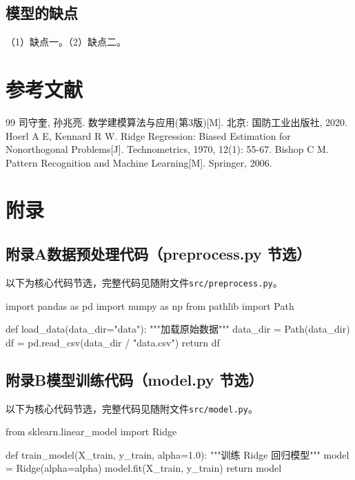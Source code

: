 \documentclass[12pt,a4paper]{article}
\renewcommand{\refname}{参考文献}
\begin{document}
\subsection{模型的缺点}

（1）缺点一。（2）缺点二。

\clearpage
\section{参考文献}

\renewcommand{\refname}{}

\begin{thebibliography}{99}
\setlength{\itemsep}{2pt}
\setlength{\topsep}{0pt}
\setlength{\labelsep}{0.5em}
 司守奎, 孙兆亮. 数学建模算法与应用(第3版)[M]. 北京: 国防工业出版社, 2020.
 Hoerl A E, Kennard R W. Ridge Regression: Biased Estimation for Nonorthogonal Problems[J]. Technometrics, 1970, 12(1): 55-67.
 Bishop C M. Pattern Recognition and Machine Learning[M]. Springer, 2006.
\end{thebibliography}

\clearpage
\section{附录}

\subsection*{附录A\quad 数据预处理代码（preprocess.py 节选）}

以下为核心代码节选，完整代码见随附文件\texttt{src/preprocess.py}。

\begin{pycode}
import pandas as pd
import numpy as np
from pathlib import Path

def load_data(data_dir="data"):
    """加载原始数据"""
    data_dir = Path(data_dir)
    df = pd.read_csv(data_dir / "data.csv")
    return df
\end{pycode}

\subsection*{附录B\quad 模型训练代码（model.py 节选）}

以下为核心代码节选，完整代码见随附文件\texttt{src/model.py}。

\begin{pycode}
from sklearn.linear_model import Ridge

def train_model(X_train, y_train, alpha=1.0):
    """训练 Ridge 回归模型"""
    model = Ridge(alpha=alpha)
    model.fit(X_train, y_train)
    return model
\end{pycode}
\end{document}
